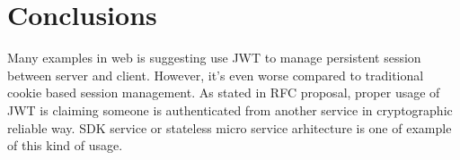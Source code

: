 \documentclass[journal,article,submit,moreauthors,pdftex,10pt,a4paper]{mdpi}
\begin{document}

\section{Conclusions}
Many examples in web is suggesting use JWT to manage persistent session between server and client. However, it's even worse compared to traditional cookie based session management. As stated in RFC proposal, proper usage of JWT is claiming someone is authenticated from another service in cryptographic reliable way. SDK service or stateless micro service arhitecture is one of example of this kind of usage.

\vspace{6pt} 





\end{document}

